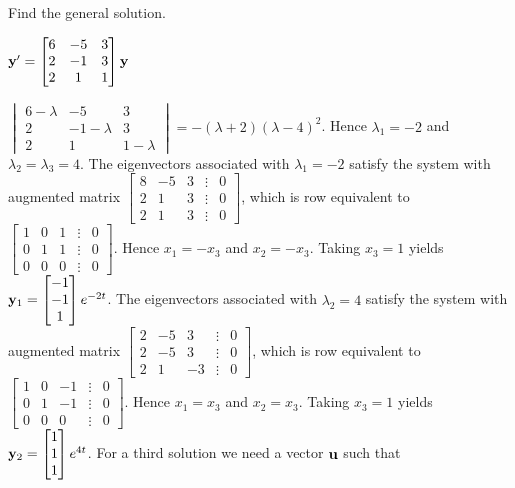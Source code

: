 \documentclass{ximera}
\begin{document}
 \begin{problem}\label{exer:10.5.12}  
 Find the general solution.
 
 $ {\bf y}'=
 \begin{bmatrix}6&-5&3\\2&-1&3\\2&1&1\end{bmatrix}{\bf y}$

 \begin{solution}
     $ \begin{vmatrix}6-\lambda&-5&3\\2&-1-\lambda&3\\2&1&1-\lambda\end{vmatrix}
=-(\lambda+2)(\lambda-4)^2$.
Hence $\lambda_1=-2$ and  $\lambda_2=\lambda_3=4$.
The eigenvectors associated
 with $\lambda_1=-2$ satisfy the system with  augmented matrix
$ \begin{bmatrix}8&-5&3&\vdots&0\\2&1&3&
\vdots&0\\2&1&3&\vdots&0\end{bmatrix}$,
which is row equivalent to
$ \begin{bmatrix}1&0&1&\vdots&0\\0&1&1&
\vdots&0\\0&0&0&\vdots&0\end{bmatrix}$.
Hence  $x_1=-x_3$ and $x_2=-x_3$.  Taking $x_3=1$
yields
${\bf y}_1= \begin{bmatrix}-1\\-1\\1\end{bmatrix}e^{-2t}$.
The eigenvectors associated
 with $\lambda_2=4$ satisfy the system with  augmented matrix
$ \begin{bmatrix}2&-5&3&\vdots&0\\2&-5&3&
\vdots&0\\2&1&-3&\vdots&0\end{bmatrix}$,
which is row equivalent to
$ \begin{bmatrix}1&0&-1&\vdots&0\\0&1&-1&
\vdots&0\\0&0&0&\vdots&0\end{bmatrix}$.
Hence  $x_1=x_3$ and $x_2=x_3$.  Taking $x_3=1$
yields
${\bf y}_2= \begin{bmatrix}1\\1\\1\end{bmatrix}e^{4t}$.
For a third solution we need a vector ${\bf u}$ such that

\end{solution}
\end{problem}
\end{document}
